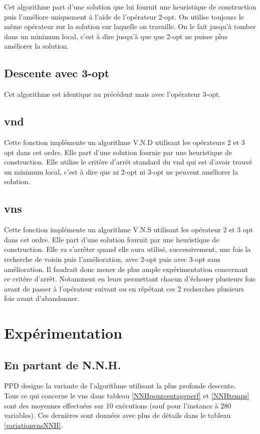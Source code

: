\documentclass[12pt,a4paper]{article}
\begin{document}
Cet algorithme part d'une solution que lui fournit une heuristique de construction puis l’améliore uniquement à l'aide de l'opérateur 2-opt. On utilise toujours le même opérateur sur la solution sur laquelle on travaille. On le fait jusqu’à tomber dans un minimum local, c'est à dire jusqu’à que que 2-opt ne puisse plus améliorer la solution.

\subsection{Descente avec 3-opt}

Cet algorithme est identique au précédent mais avec l'opérateur 3-opt.

\subsection{vnd}

Cette fonction implémente un algorithme V.N.D utilisant les opérateurs 2 et 3 opt dans cet ordre. Elle part d'une solution fournie par une heuristique de construction. Elle utilise le critère d’arrêt standard du vnd qui est d'avoir trouvé un minimum local, c'est à dire que ni 2-opt ni 3-opt ne peuvent améliorer la solution.

\subsection{vns}

Cette fonction implémente un algorithme V.N.S utilisant les opérateur 2 et 3 opt dans cet ordre. Elle part d'une solution fournit par une heuristique de construction. Elle va s’arrêter quand elle aura utilisé, successivement, une fois la recherche de voisin puis l'amélioration, avec 2-opt puis avec 3-opt sans amélioration. Il faudrait donc mener de plus ample expérimentation concernant ce critère d’arrêt. Notamment en leurs permettant chacun d'échouer plusieurs fois avant de passer à l'opérateur suivant ou en répétant ces 2 recherches plusieurs fois avant d'abandonner.

\section{Expérimentation}
\subsection{En partant de N.N.H.}
PPD designe la variante de l'algorithme utilisant la plus profonde descente.\\
Tous ce qui concerne le vns dans tableau \ref{NNHpourcentageperf} et \ref{NNHtemps} sont des moyennes effectuées sur 10 exécutions (sauf pour l'instance à 280 variables). Ces dernières sont données avec plus de détails dans le tableau \ref{variationvnsNNH}.\\
\end{document}
